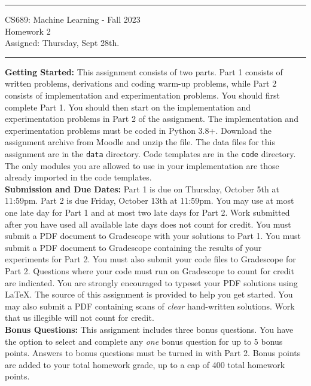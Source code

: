 \documentclass[11pt]{article}
\begin{document}
{\centering
  \rule{6.3in}{2pt}
  \vspace{1em}
  {\Large
    CS689: Machine Learning - Fall 2023\\
    Homework 2\\
  }
  \vspace{1em}
  Assigned: Thursday, Sept 28th. \\
  \vspace{0.1em}
  \rule{6.3in}{1.5pt}
}
\vspace{1pc}


\textbf{Getting Started:} This assignment consists of two parts. Part 1 consists of written problems, derivations and coding warm-up problems, while Part 2 consists of implementation and experimentation problems. You should first complete Part 1. You should then start on the implementation and experimentation problems in Part 2 of the assignment. The implementation and experimentation problems must be coded in Python 3.8+. Download the assignment archive from Moodle and unzip the file. The data files for this assignment are in the \verb|data| directory. Code templates are in the \verb|code| directory. The only modules you are allowed to use in your implementation are those already imported in the code templates.\\

\textbf{Submission and Due Dates:} Part 1 is due on Thursday, October 5th at 11:59pm. Part 2 is due Friday, October 13th at 11:59pm. You may use at most one late day for Part 1 and at most two late days for Part 2. Work submitted after you have used all available late days does not count for credit. You must submit a PDF document to Gradescope with your solutions to Part 1. You must submit a PDF document to Gradescope containing the results of your experiments for Part 2. You must also submit your code files to Gradescope for Part 2. Questions where your code must run on Gradescope to count for credit are indicated. You are strongly encouraged to typeset your PDF solutions using LaTeX. The source of this assignment is provided to help you get started. You may also submit a PDF containing scans of \textit{clear} hand-written solutions. Work that us illegible will not count for credit.\\

\textbf{Bonus Questions:} This assignment includes three bonus questions. You have the option to select and complete any \textit{one} bonus question for up to 5 bonus points. Answers to bonus questions must be turned in with Part 2. Bonus points are added to your total homework grade, up to a cap of 400 total homework points.\\ 
\end{document}
